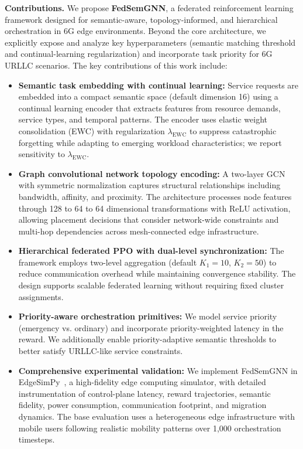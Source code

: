 \documentclass[conference]{IEEEtran}
\begin{document}
		\noindent\textbf{Contributions.} We propose \textbf{FedSemGNN}, a federated reinforcement learning framework designed for semantic-aware, topology-informed, and hierarchical orchestration in 6G edge environments. Beyond the core architecture, we explicitly expose and analyze key hyperparameters (semantic matching threshold and continual-learning regularization) and incorporate task priority for 6G URLLC scenarios. The key contributions of this work include:
		
		\begin{itemize}
			\item \textbf{Semantic task embedding with continual learning:} Service requests are embedded into a compact semantic space (default dimension 16) using a continual learning encoder that extracts features from resource demands, service types, and temporal patterns. The encoder uses elastic weight consolidation (EWC) with regularization $\lambda_{\mathrm{EWC}}$ to suppress catastrophic forgetting while adapting to emerging workload characteristics; we report sensitivity to $\lambda_{\mathrm{EWC}}$.
			
			\item \textbf{Graph convolutional network topology encoding:} A two-layer GCN with symmetric normalization captures structural relationships including bandwidth, affinity, and proximity. The architecture processes node features through 128 to 64 to 64 dimensional transformations with ReLU activation, allowing placement decisions that consider network-wide constraints and multi-hop dependencies across mesh-connected edge infrastructure.
			
			\item \textbf{Hierarchical federated PPO with dual-level synchronization:} The framework employs two-level aggregation (default $K_1{=}10$, $K_2{=}50$) to reduce communication overhead while maintaining convergence stability. The design supports scalable federated learning without requiring fixed cluster assignments.
			
			\item \textbf{Priority-aware orchestration primitives:} We model service priority (emergency vs. ordinary) and incorporate priority-weighted latency in the reward. We additionally enable priority-adaptive semantic thresholds to better satisfy URLLC-like service constraints.
			
			\item \textbf{Comprehensive experimental validation:} We implement FedSemGNN in EdgeSimPy~\cite{souza2023edgesimpy}, a high-fidelity edge computing simulator, with detailed instrumentation of control-plane latency, reward trajectories, semantic fidelity, power consumption, communication footprint, and migration dynamics. The base evaluation uses a heterogeneous edge infrastructure with mobile users following realistic mobility patterns over 1,000 orchestration timesteps.
			

\end{itemize}
\end{document}
